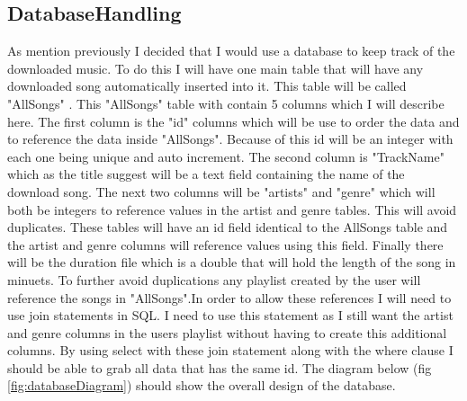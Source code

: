 \documentclass{article}
\begin{document}
\subsection{DatabaseHandling}\label{DatabaseHandling}
As mention previously I decided that I would use a database to keep track of the
downloaded music. To do this I will have one main table that will have any
downloaded song automatically inserted into it. This table will be called "AllSongs"
. This "AllSongs" table with contain 5 columns which I will describe here.
The first column is the "id" columns which will be use to order the data
and to reference the data inside "AllSongs". Because of this id will be an
integer with each one being unique and auto increment. The second column
is "TrackName" which as the title suggest will be a text field containing
the name of the download song. The next two columns will be "artists" and
"genre" which will both be integers to reference values in the artist and
genre tables. This will avoid duplicates. These tables will have an id field
identical to the AllSongs table and the artist and genre columns will
reference values using this field. Finally there will be the duration
file which is a double that will hold the length of the song in minuets.
To further avoid duplications any playlist created by the user will reference
the songs in "AllSongs".In order to allow these references I will need to use join
statements in SQL. I need to use this statement as I still want the artist and
genre columns in the users playlist without having to create this additional columns.
By using select with these join statement along with the where clause I should
be able to grab all data that has the same id. The diagram below (fig \ref{fig:databaseDiagram}) should show
the overall design of the database.
\end{document}
